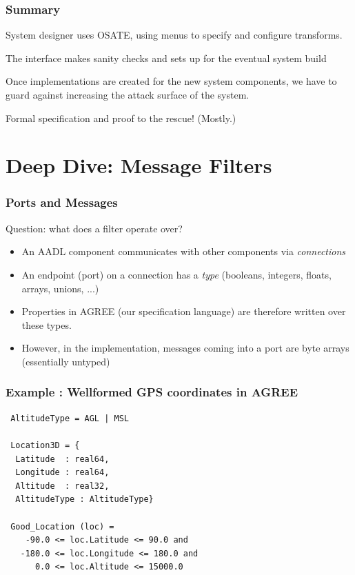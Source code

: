 \documentclass{beamer}
\begin{document}
\begin{frame}\frametitle{Summary}

System designer uses OSATE, using menus to specify and configure transforms.

The interface makes sanity checks and sets up for the eventual system build

Once implementations are created for the new system components, we
have to guard against increasing the attack surface of the system.

Formal specification and proof to the rescue! (Mostly.)

\end{frame}

\section {Deep Dive: Message Filters}

\begin{frame}\frametitle{Ports and Messages}

Question: what does a filter operate over?

\begin{itemize}

  \item An AADL component communicates with other components via \emph{connections}

\item  An endpoint (port) on a connection has a \emph{type} (booleans,
  integers, floats, arrays, unions, ...)

\item Properties in AGREE (our specification language) are therefore written over these types.

\item However, in the implementation, messages coming into a port are
  byte arrays (essentially untyped)

\end{itemize}

\end{frame}

\begin{frame}[fragile]\frametitle{Example : Wellformed GPS coordinates in AGREE}

{\small
\begin{verbatim}
 AltitudeType = AGL | MSL

 Location3D = {
  Latitude  : real64,
  Longitude : real64,
  Altitude  : real32,
  AltitudeType : AltitudeType}

 Good_Location (loc) =
    -90.0 <= loc.Latitude <= 90.0 and
   -180.0 <= loc.Longitude <= 180.0 and
      0.0 <= loc.Altitude <= 15000.0
\end{verbatim}
}

\end{frame}
\end{document}
